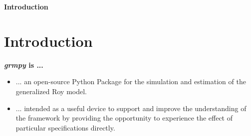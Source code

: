 \begin{frame}\begin{center}
\LARGE\textbf{Introduction}
\end{center}\end{frame}

\section{Introduction}

\begin{frame}
\textbf{\textit{grmpy} is ...}

\bigskip
   \begin{itemize}\setlength\itemsep{1em}
      \item ... an open-source Python Package for the simulation and estimation of the generalized Roy model.
      
      \medskip
      \item ... intended as a useful device to support and improve the understanding of the framework by providing the opportunity to experience the effect of particular specifications directly.
    \end{itemize}

\end{frame}
